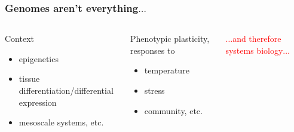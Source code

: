 \begin{frame}
\begin{columns}[c]
    \end{columns}  
\end{frame}

\begin{frame}
  \frametitle{Genomes aren't everything$\ldots$}
    \begin{columns}[c] 
        \begin{alertblock}{Context}
          \begin{itemize}
            \item epigenetics
            \item tissue differentiation/differential expression
            \item mesoscale systems, etc.
          \end{itemize}
        \end{alertblock}
        \begin{block}{Phenotypic plasticity, responses to}         
          \begin{itemize}
            \item temperature
            \item stress
            \item community, etc.
          \end{itemize}
        \end{block}
        \textcolor{red}{$\ldots$and therefore systems biology$\ldots$}

\end{columns}
\end{frame}
